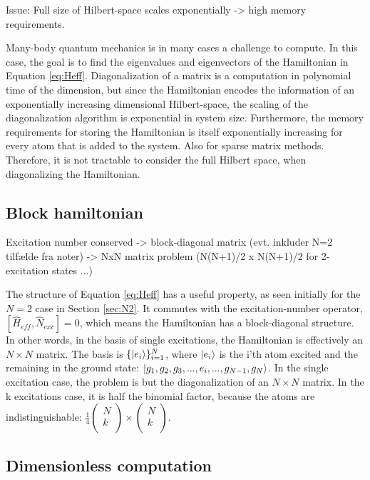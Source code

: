 \documentclass{article}
\begin{document}
Issue: Full size of Hilbert-space scales exponentially -> high memory requirements.

Many-body quantum mechanics is in many cases a challenge to compute. In this case, the goal is to find the eigenvalues and eigenvectors of the Hamiltonian in Equation \ref{eq:Heff}. Diagonalization of a matrix is a computation in polynomial time of the dimension, but since the Hamiltonian encodes the information of an exponentially increasing dimensional Hilbert-space, the scaling of the diagonalization algorithm is exponential in system size. Furthermore, the memory requirements for storing the Hamiltonian is itself exponentially increasing for every atom that is added to the system. Also for sparse matrix methods. Therefore, it is not tractable to consider the full Hilbert space, when diagonalizing the Hamiltonian. 

\subsection{Block hamiltonian}\label{sec:block}

Excitation number conserved -> block-diagonal matrix (evt. inkluder N=2 tilfælde fra noter) -> NxN matrix problem (N(N+1)/2 x N(N+1)/2 for 2-excitation states ...)

The structure of Equation \ref{eq:Heff} has a useful property, as seen initially for the $N=2$ case in Section \ref{sec:N2}. It commutes with the excitation-number operator, $[\hat{H}_{eff}, \hat{N}_{exc}] = 0$, which means the Hamiltonian has a block-diagonal structure. In other words, in the basis of single excitations, the Hamiltonian is effectively an $N \times N$ matrix. The basis is $\{ \ket{e_i} \}_{i=1}^N$, where $\ket{e_i}$ is the i'th atom excited and the remaining in the ground state: $\ket{g_1, g_2, g_3, ..., e_i, ..., g_{N-1}, g_N}$. In the single excitation case, the problem is but the diagonalization of an $N \times N$ matrix. In the k excitations case, it is half the binomial factor, because the atoms are indistinguishable: $\frac{1}{4} \begin{pmatrix} N \\ k \\ \end{pmatrix} \times \begin{pmatrix} N \\ k \\ \end{pmatrix}$.

\subsection{Dimensionless computation}\label{sec:dimless}
\end{document}
